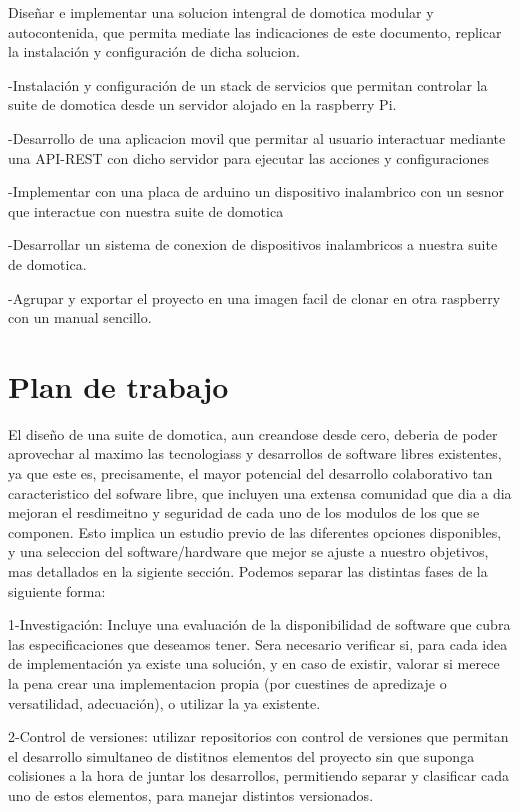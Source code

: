 Diseñar e implementar una solucion intengral de domotica modular y autocontenida, que permita mediate las indicaciones de este documento, replicar la instalación y configuración de dicha solucion.

-Instalación y configuración de un stack de servicios que permitan controlar la suite de domotica desde un servidor alojado en la raspberry Pi.

-Desarrollo de una aplicacion movil que permitar al usuario interactuar mediante una API-REST con dicho servidor para ejecutar las acciones y configuraciones

-Implementar con una placa de arduino un dispositivo inalambrico con un sesnor que interactue con nuestra suite de domotica

-Desarrollar un sistema de conexion de dispositivos inalambricos a nuestra suite de domotica.

-Agrupar y exportar el proyecto en una imagen facil de clonar en otra raspberry con un manual sencillo.

\section{Plan de trabajo}
\label{ch:Capitulo1.3}

El diseño de una suite de domotica, aun creandose desde cero, deberia de poder aprovechar al maximo las tecnologiass y desarrollos de software libres existentes, ya que este es, precisamente, el mayor potencial del desarrollo colaborativo tan caracteristico del sofware libre, que incluyen una extensa comunidad que dia a dia mejoran el resdimeitno y seguridad de cada uno de los modulos de los que se componen. Esto implica un estudio previo de las diferentes opciones disponibles, y una seleccion del software/hardware que mejor se ajuste a nuestro objetivos, mas detallados en la sigiente sección. Podemos separar las distintas fases de la siguiente forma:

1-Investigación: Incluye una evaluación de la disponibilidad de software que cubra las especificaciones que deseamos tener. Sera necesario verificar si, para cada idea de implementación ya existe una solución, y en caso de existir, valorar si merece la pena crear una implementacion propia (por cuestines de apredizaje o versatilidad, adecuación), o utilizar la ya existente.

2-Control de versiones: utilizar repositorios con control de versiones que permitan el desarrollo simultaneo de distitnos elementos del proyecto sin que suponga colisiones a la hora de juntar los desarrollos, permitiendo separar y clasificar cada uno de estos elementos, para manejar distintos versionados.

